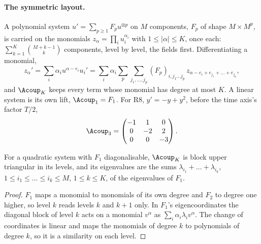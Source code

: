 \paragraph{The symmetric layout.} A polynomial system $u'=\sum_{p\ge1}F_pu^{\otimes p}$ on $M$ components, $F_p$ of shape $M\times M^p$, is carried on the monomials $z_\alpha=\prod_iu_i^{\alpha_i}$ with $1\le|\alpha|\le K$, once each: $\sum_{k=1}^K\binom{M+k-1}{k}$ components, level by level, the fields first. Differentiating a monomial,
\begin{equation}
    z_\alpha'=\sum_i\alpha_iu^{\alpha-e_i}u_i'
    =\sum_i\alpha_i\sum_p\sum_{j_1,\dots,j_p}(F_p)_{i,j_1\dots j_p}\,z_{\alpha-e_i+e_{j_1}+\dots+e_{j_p}},
\end{equation}
and $\Acoup_K$ keeps every term whose monomial has degree at most $K$. A linear system is its own lift, $\Acoup_1=F_1$. For R8, $y'=-y+y^2$, before the time axis's factor $T/2$,
\begin{equation}
    \Acoup_3=\begin{pmatrix}-1 & 1 & 0\\ 0 & -2 & 2\\ 0 & 0 & -3\end{pmatrix}.
\end{equation}

\begin{proposition}
\label{prop:carleman-spectrum}
For a quadratic system with $F_1$ diagonalisable, $\Acoup_K$ is block upper triangular in its levels, and its eigenvalues are the sums $\lambda_{i_1}+\dots+\lambda_{i_k}$, $1\le i_1\le\dots\le i_k\le M$, $1\le k\le K$, of the eigenvalues of $F_1$.
\end{proposition}
\begin{proof}
$F_1$ maps a monomial to monomials of its own degree and $F_2$ to degree one higher, so level $k$ reads levels $k$ and $k+1$ only. In $F_1$'s eigencoordinates the diagonal block of level $k$ acts on a monomial $v^\alpha$ as $\sum_i\alpha_i\lambda_iv^\alpha$. The change of coordinates is linear and maps the monomials of degree $k$ to polynomials of degree $k$, so it is a similarity on each level.
\end{proof}

